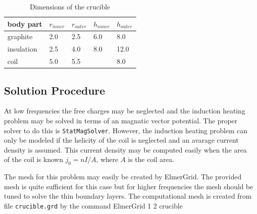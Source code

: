 \begin{table}
\caption{Dimensions of the crucible}
\label{tab:ind_heat2}
\begin{center}
\begin{tabular}{lllll} \hline
body part &  $r_{inner}$ & $r_{outer}$ & $h_{inner}$ & $h_{outer}$ \\ \hline
graphite  &  2.0   &  2.5 & 6.0 & 8.0 \\
insulation &  2.5   &  4.0 & 8.0 & 12.0 \\
coil      &  5.0   & 5.5  &     & 8.0  \\ \hline
\end{tabular}
\end{center}
\end{table}


\subsection*{Solution Procedure}

At low frequencies the free charges may be neglected and the 
induction heating problem may be solved in terms 
of an magnatic vector potential. The proper solver to do
this is \texttt{StatMagSolver}.
However, the induction heating problem can only be modeled if the helicity 
of the coil is neglected and an avarage current density is assumed.
This current density may be computed easily when the 
area of the coil is known $j_0=n I / A$, where $A$ is the 
coil area.

The mesh for this problem may easily be created by ElmerGrid.
The provided mesh is quite sufficient for this case
but for higher frequencies the mesh should be tuned 
to solve the thin boundary layers.
The computational mesh is created from file \texttt{crucible.grd} by the 
command 
\ttbegin
ElmerGrid 1 2 crucible
\ttend

